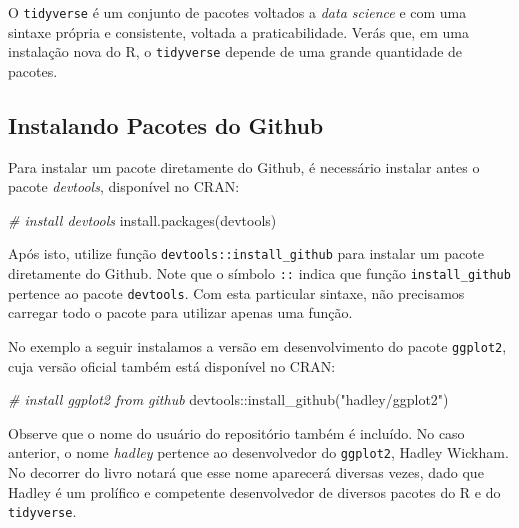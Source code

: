 \documentclass[
  11pt,
]{book}
\newenvironment{Shaded}{\begin{snugshade}}{\end{snugshade}}
\newcommand{\CommentTok}[1]{\textcolor[rgb]{0.37,0.37,0.37}{\textit{#1}}}
\newcommand{\FunctionTok}[1]{\textcolor[rgb]{0,0,0}{#1}}
\newcommand{\NormalTok}[1]{#1}
\newcommand{\SpecialCharTok}[1]{\textcolor[rgb]{0,0,0}{#1}}
\newcommand{\StringTok}[1]{\textcolor[rgb]{0.5,0.5,0.5}{#1}}
\begin{document}
O \texttt{tidyverse} é um conjunto de pacotes voltados a \emph{data science} e com uma sintaxe própria e consistente, voltada a praticabilidade. Verás que, em uma instalação nova do R, o \texttt{tidyverse} depende de uma grande quantidade de pacotes.

\hypertarget{instalando-pacotes-do-github}{%
\subsection{Instalando Pacotes do Github}\label{instalando-pacotes-do-github}}

Para instalar um pacote diretamente do Github, é necessário instalar antes o pacote \emph{devtools}, disponível no CRAN: 

\begin{Shaded}
\begin{Highlighting}[]
\CommentTok{\# install devtools}
\FunctionTok{install.packages}\NormalTok{(}\StringTok{\textquotesingle{}devtools\textquotesingle{}}\NormalTok{)}
\end{Highlighting}
\end{Shaded}

Após isto, utilize função \texttt{devtools::install\_github} para instalar um pacote diretamente do Github. Note que o símbolo \texttt{::} indica que função \texttt{install\_github} pertence ao pacote \texttt{devtools}. Com esta particular sintaxe, não precisamos carregar todo o pacote para utilizar apenas uma função.

No exemplo a seguir instalamos a versão em desenvolvimento do pacote \texttt{ggplot2}, cuja versão oficial também está disponível no CRAN: 

\begin{Shaded}
\begin{Highlighting}[]
\CommentTok{\# install ggplot2 from github}
\NormalTok{devtools}\SpecialCharTok{::}\FunctionTok{install\_github}\NormalTok{(}\StringTok{"hadley/ggplot2"}\NormalTok{)}
\end{Highlighting}
\end{Shaded}

Observe que o nome do usuário do repositório também é incluído. No caso anterior, o nome \emph{hadley} pertence ao desenvolvedor do \texttt{ggplot2}, Hadley Wickham. No decorrer do livro notará que esse nome aparecerá diversas vezes, dado que Hadley é um prolífico e competente desenvolvedor de diversos pacotes do R e do \texttt{tidyverse}.
\end{document}
